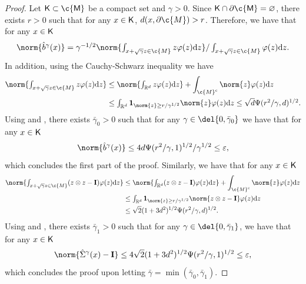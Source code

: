 \begin{proof}
	Let $\sf{K} \subset \c{M}$ be a compact set and $\gamma >0$.
	Since $\sf{K} \cap \partial \c{M} = \emptyset$, there exists $r > 0$ such that for any $x \in \sf{K}$, $d(x, \partial \c{M}) > r$.
	Therefore, we have that for any $x \in \sf{K}$ \begin{equation} \textstyle{ \norm{\hat{b}^\gamma(x)} = \gamma^{-1/2} \norm{\int_{x + \sqrt{\gamma}z \in \c{M}} z \varphi(z) \mathrm{d} z} / \int_{x + \sqrt{\gamma}z \in \c{M}} \varphi(z) \mathrm{d} z .
		}
	\end{equation}
	In addition, using the Cauchy-Schwarz inequality we have \begin{align} \textstyle{\norm{\int_{x + \sqrt{\gamma}z \in \c{M}} z \varphi(z) \mathrm{d} z}} & \leq \norm{ \textstyle{\int_{\R^d} z \varphi(z) \mathrm{d} z}} + \int_{\c{M}^\mathrm{c}} \norm{z} \varphi(z) \mathrm{d} z \\  & \leq \textstyle{\int_{\R^d} \bm{1}_{\norm{z} \geq r / \gamma^{1/2}} \norm{z} \varphi(z) \mathrm{d} z \leq \sqrt{d} \Psi(r^2/\gamma, d)^{1/2} .
                 }
	\end{align}
	Using  and , there exists $\bar{\gamma}_0 >0$ such that for any $\gamma \in \del{0, \bar{\gamma}_0}$ we have that for any $x \in \sf{K}$ \begin{equation} \norm{\hat{b}^\gamma(x)} \leq 4d\Psi(r^2/\gamma,1)^{1/2}/\gamma^{1/2} \leq \varepsilon , \end{equation} which concludes the first part of the proof.
	Similarly, we have that for any $x \in \sf{K}$ \begin{align} \textstyle{\norm{\int_{x + \sqrt{\gamma}z \in \c{M}} (z \otimes z - \m{I}) \varphi(z) \mathrm{d} z}} & \leq \norm{ \textstyle{\int_{\R^d} (z\otimes z - \m{I}) \varphi(z) \mathrm{d} z}} + \int_{\c{M}^\mathrm{c}} \norm{z} \varphi(z) \mathrm{d} z \\ &\leq \textstyle{\int_{\R^d} \bm{1}_{\norm{z} \geq r / \gamma^{1/2}} \norm{z \otimes z - \m{I}} \varphi(z) \mathrm{d} z} \\ & \leq \sqrt{2}(1 + 3d^2)^{1/2} \Psi(r^2/\gamma, d)^{1/2} .
	\end{align}
	Using  and , there exists $\bar{\gamma}_1 >0$ such that for any $\gamma \in \del{0, \bar{\gamma}_1}$, we have that for any $x \in \sf{K}$ \begin{equation} \norm{\hat{\Sigma}^\gamma(x) - \m{I}} \leq 4 \sqrt{2}(1 + 3d^2)^{1/2} \Psi(r^2/\gamma, 1)^{1/2} \leq \varepsilon , \end{equation} which concludes the proof upon letting $\bar{\gamma} = \min(\bar{\gamma}_0, \bar{\gamma}_1)$.
\end{proof}

